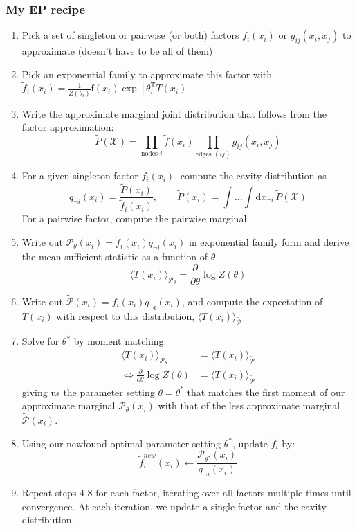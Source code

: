 \documentclass[a4paper]{article}
\begin{document}
\subsubsection{My EP recipe}
\begin{enumerate}
\item Pick a set of singleton or pairwise (or both) factors $f_i(x_i)$ or $g_{ij}(x_i,x_j)$ to approximate (doesn't have to be all of them)
\item Pick an exponential family to approximate this factor with $\tilde{f}_i(x_i) = \frac{1}{Z(\theta_i)}\textrm{f}(x_i)\exp[\theta_i^\textrm{T}T(x_i)]$
\item Write the approximate marginal joint distribution that follows from the factor approximation: 
\[ \tilde{P}(\mathcal{X}) = \prod_{\textrm{nodes }i}\tilde{f}(x_i)\prod_{\textrm{edges }(ij)}g_{ij}(x_i,x_j)\]
\item For a given singleton factor $f_i(x_i)$, compute the cavity distribution as
\[ q_{\neg i}(x_i) = \frac{\tilde{P}(x_i)}{\tilde{f}_i(x_i)}, \quad\quad \tilde{P}(x_i) = \int\ldots\int \textrm{d}x_{\neg i}\, \tilde{P}(\mathcal{X}) \]
For a pairwise factor, compute the pairwise marginal.
\item Write out $\mathcal{P}_\theta(x_i) = \tilde{f}_i(x_i)q_{\neg i}(x_i)$ in exponential family form and derive the mean sufficient statistic as a function of $\theta$ 
\[ \langle T(x_i)\rangle_{\mathcal{P}_\theta} = \frac{\partial}{\partial \theta}\log Z(\theta) \]
\item Write out $\tilde{\mathcal{P}}(x_i) = f_i(x_i)q_{\neg i}(x_i)$, and compute the expectation of $T(x_i)$ with respect to this distribution, $\langle T(x_i)\rangle_{\tilde{\mathcal{P}}}$
\item Solve for $\theta^*$ by moment matching:
\begin{align*}
\langle T(x_i)\rangle_{\mathcal{P}_\theta} &= \langle T(x_i)\rangle_{\tilde{\mathcal{P}}} \\
\Leftrightarrow \frac{\partial}{\partial \theta}\log Z(\theta) &= \langle T(x_i)\rangle_{\tilde{\mathcal{P}}}
\end{align*}
giving us the parameter setting $\theta = \theta^*$ that matches the first moment of our approximate marginal $\mathcal{P}_\theta(x_i)$ with that of the less approximate marginal $\tilde{\mathcal{P}}(x_i)$.
\item Using our newfound optimal parameter setting $\theta^*$, update $\tilde{f}_i$ by:
\[ \tilde{f}_i^{new}(x_i) \leftarrow \frac{\mathcal{P}_{\theta^*}(x_i)}{q_{\neg i}(x_i)} \]
\item Repeat steps 4-8 for each factor, iterating over all factors multiple times until convergence. At each iteration, we update a single factor and the cavity distribution.
\end{enumerate}
\end{document}
